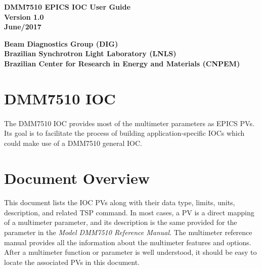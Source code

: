 \documentclass[openany]{article}
\begin{document}
\begin{titlepage}


\begin{center}

\vspace*{\fill}
\textbf{\Huge DMM7510 EPICS IOC User Guide}\\[20pt]
\textbf{\Huge Version 1.0}\\[20pt]
\textbf{\Huge June/2017}
\vspace*{\fill}

\vfill
\textbf{Beam Diagnostics Group (DIG)}\\[5pt]
\textbf{Brazilian Synchrotron Light Laboratory (LNLS)}\\[5pt]
\textbf{Brazilian Center for Research in Energy and Materials (CNPEM)}
\end{center}

\end{titlepage}

\newpage
\pagestyle{plain} %

\tableofcontents

\newpage
\section{DMM7510 IOC}

	\paragraph{} The DMM7510 IOC provides most of the multimeter parameters as EPICS PVs. Its goal is to facilitate the process of building application-specific IOCs which could make use of a DMM7510 general IOC.

\section{Document Overview}

	\paragraph{} This document lists the IOC PVs along with their data type, limits, units, description, and related TSP command. In most cases, a PV is a direct mapping of a multimeter parameter, and its description is the same provided for the parameter in the \emph{Model DMM7510 Reference Manual}. The multimeter reference manual provides all the information about the multimeter features and options. After a multimeter function or parameter is well understood, it should be easy to locate the associated PVs in this document.
\end{document}
